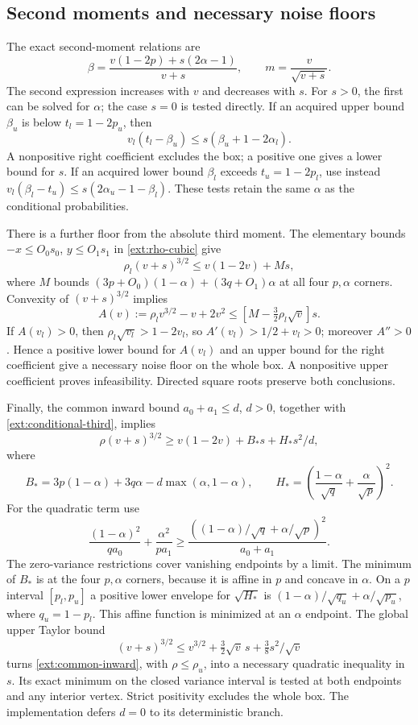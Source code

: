 \subsection{Second moments and necessary noise floors}
The exact second-moment relations are
\begin{equation}\label{ext:beta-noise}
 \beta=\frac{v(1-2p)+s(2\alpha-1)}{v+s},\qquad
 m=\frac{v}{\sqrt{v+s}}.
\end{equation}
The second expression increases with $v$ and decreases with $s$.
For $s>0$, the first can be solved for $\alpha$; the case $s=0$
is tested directly. If an acquired upper bound $\beta_u$ is below
$t_l=1-2p_u$, then
\[
 v_l(t_l-\beta_u)\le s(\beta_u+1-2\alpha_l).
\]
A nonpositive right coefficient excludes the box; a positive one
gives a lower bound for $s$. If an acquired lower bound $\beta_l$
exceeds $t_u=1-2p_l$, use instead
$v_l(\beta_l-t_u)\le s(2\alpha_u-1-\beta_l)$.
These tests retain the same $\alpha$ as the conditional probabilities.

There is a further floor from the absolute third moment. The elementary
bounds $-x\le O_0s_0$, $y\le O_1s_1$ in
\eqref{ext:rho-cubic} give
\[
 \rho_l(v+s)^{3/2}\le v(1-2v)+Ms,
\]
where $M$ bounds
$(3p+O_0)(1-\alpha)+(3q+O_1)\alpha$ at all four
$p,\alpha$ corners. Convexity of $(v+s)^{3/2}$ implies
\[
 A(v):=\rho_l v^{3/2}-v+2v^2
 \le [M-\tfrac32\rho_l\sqrt v]s.
\]
If $A(v_l)>0$, then
$\rho_l\sqrt{v_l}>1-2v_l$, so
$A'(v_l)>1/2+v_l>0$; moreover $A''>0$.
Hence a positive lower bound for $A(v_l)$ and an upper bound for
the right coefficient give a necessary noise floor on the whole box.
A nonpositive upper coefficient proves infeasibility. Directed square
roots preserve both conclusions.

Finally, the common inward bound $a_0+a_1\le d$, $d>0$,
together with \eqref{ext:conditional-third}, implies
\begin{equation}\label{ext:common-inward}
 \rho(v+s)^{3/2}\ge v(1-2v)+B_*s+H_*s^2/d,
\end{equation}
where
\[
 B_*=3p(1-\alpha)+3q\alpha-d\max(\alpha,1-\alpha),\qquad
 H_*=\left(\frac{1-\alpha}{\sqrt q}+\frac\alpha{\sqrt p}\right)^2.
\]
For the quadratic term use
\[
 \frac{(1-\alpha)^2}{qa_0}+\frac{\alpha^2}{pa_1}
 \ge\frac{((1-\alpha)/\sqrt q+\alpha/\sqrt p)^2}{a_0+a_1}.
\]
The zero-variance restrictions cover vanishing endpoints by a limit.
The minimum of $B_*$ is at the four $p,\alpha$ corners, because it is
affine in $p$ and concave in $\alpha$.
On a $p$ interval $[p_l,p_u]$ a positive lower envelope for
$\sqrt{H_*}$ is $(1-\alpha)/\sqrt{q_u}+\alpha/\sqrt{p_u}$,
where $q_u=1-p_l$. This affine function is minimized at an
$\alpha$ endpoint. The global upper Taylor bound
\[
 (v+s)^{3/2}\le v^{3/2}+\tfrac32\sqrt v\,s
                                      +\tfrac38s^2/\sqrt v
\]
turns \eqref{ext:common-inward}, with $\rho\le\rho_u$, into a
necessary quadratic inequality in $s$. Its exact minimum on the
closed variance interval is tested at both endpoints and any interior
vertex. Strict positivity excludes the whole box. The implementation
defers $d=0$ to its deterministic branch.

